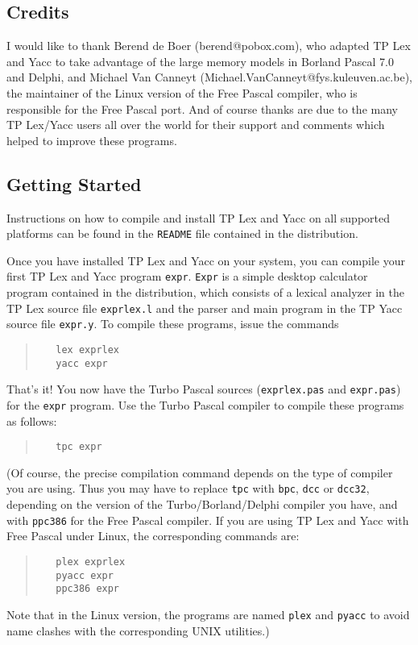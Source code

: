 \subsection*{Credits}

I would like to thank Berend de Boer (berend@pobox.com), who adapted TP Lex
and Yacc to take advantage of the large memory models in Borland Pascal 7.0
and Delphi, and Michael Van Canneyt (Michael.VanCanneyt@fys.kuleuven.ac.be),
the maintainer of the Linux version of the Free Pascal compiler, who is
responsible for the Free Pascal port. And of course thanks are due to the many
TP Lex/Yacc users all over the world for their support and comments which
helped to improve these programs.


\subsection*{Getting Started}

Instructions on how to compile and install TP Lex and Yacc on all supported
platforms can be found in the \verb"README" file contained in the
distribution.

Once you have installed TP Lex and Yacc on your system, you can compile your
first TP Lex and Yacc program \verb"expr". \verb"Expr" is a simple desktop
calculator program contained in the distribution, which consists of a lexical
analyzer in the TP Lex source file \verb"exprlex.l" and the parser and main
program in the TP Yacc source file \verb"expr.y". To compile these programs,
issue the commands
\begin{quote}\begin{verbatim}
   lex exprlex
   yacc expr
\end{verbatim}\end{quote}
That's it! You now have the Turbo Pascal sources (\verb"exprlex.pas" and
\verb"expr.pas") for the \verb"expr" program. Use the Turbo Pascal
compiler to compile these programs as follows:
\begin{quote}\begin{verbatim}
   tpc expr
\end{verbatim}\end{quote}

(Of course, the precise compilation command depends on the type of compiler
you are using. Thus you may have to replace \verb"tpc" with \verb"bpc",
\verb"dcc" or \verb"dcc32", depending on the version of the
Turbo/Borland/Delphi compiler you have, and with \verb"ppc386" for the Free
Pascal compiler. If you are using TP Lex and Yacc with Free Pascal under
Linux, the corresponding commands are:
\begin{quote}\begin{verbatim}
   plex exprlex
   pyacc expr
   ppc386 expr
\end{verbatim}\end{quote}
Note that in the Linux version, the programs are named \verb"plex" and
\verb"pyacc" to avoid name clashes with the corresponding UNIX utilities.)


